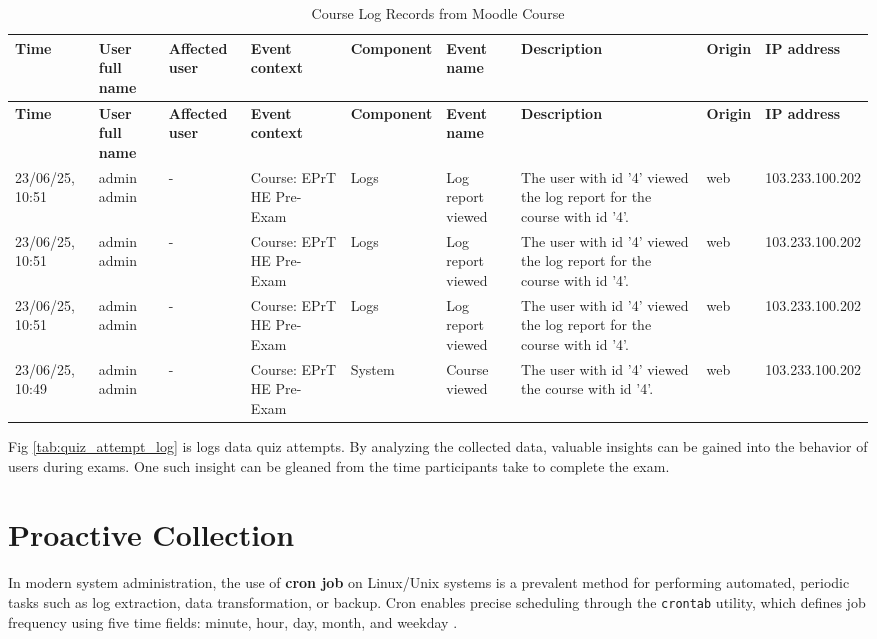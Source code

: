 \begin{landscape}
\begin{longtable}{|p{1.4cm}|p{2cm}|p{1.3cm}|p{2.5cm}|p{1.8cm}|p{3cm}|p{4.2cm}|p{1.2cm}|p{2.5cm}|}
\caption{Course Log Records from Moodle Course} \label{tab:course-log} \\
\hline
\textbf{Time} & \textbf{User full name} & \textbf{Affected user} & \textbf{Event context} & \textbf{Component} & \textbf{Event name} & \textbf{Description} & \textbf{Origin} & \textbf{IP address} \\
\hline
\endfirsthead

\hline
\textbf{Time} & \textbf{User full name} & \textbf{Affected user} & \textbf{Event context} & \textbf{Component} & \textbf{Event name} & \textbf{Description} & \textbf{Origin} & \textbf{IP address} \\
\hline
\endhead

23/06/25, 10:51 & admin admin & - & Course: EPrT HE Pre-Exam & Logs & Log report viewed & The user with id '4' viewed the log report for the course with id '4'. & web & 103.233.100.202 \\
\hline
23/06/25, 10:51 & admin admin & - & Course: EPrT HE Pre-Exam & Logs & Log report viewed & The user with id '4' viewed the log report for the course with id '4'. & web & 103.233.100.202 \\
\hline
23/06/25, 10:51 & admin admin & - & Course: EPrT HE Pre-Exam & Logs & Log report viewed & The user with id '4' viewed the log report for the course with id '4'. & web & 103.233.100.202 \\
\hline
23/06/25, 10:49 & admin admin & - & Course: EPrT HE Pre-Exam & System & Course viewed & The user with id '4' viewed the course with id '4'. & web & 103.233.100.202 \\
\hline

\end{longtable}
\end{landscape}

Fig \ref{tab:quiz_attempt_log} is logs data quiz attempts. By analyzing the collected data, valuable insights can be gained into the behavior of users during exams. One such insight can be gleaned from the time participants take to complete the exam.



\section{Proactive Collection}
In modern system administration, the use of \textbf{cron job} on Linux/Unix systems is a prevalent method for performing automated, periodic tasks such as log extraction, data transformation, or backup. Cron enables precise scheduling through the \texttt{crontab} utility, which defines job frequency using five time fields: minute, hour, day, month, and weekday \citet{davidovic2015cron}.

